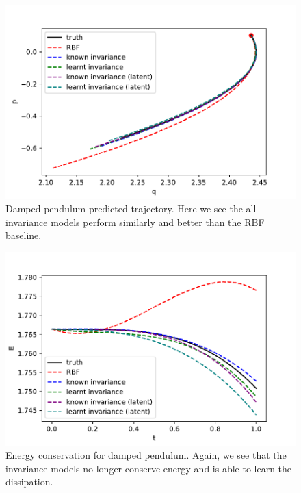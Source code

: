 \documentclass{statsmsc}
\begin{document}
\begin{figure}[H]
        \centering
        \includegraphics[width=0.8\linewidth]{../codes/figures/damped_pendulum_predicted.pdf}
        \caption{Damped pendulum predicted trajectory. Here we see the all invariance models perform similarly and better than the RBF baseline.}
        \label{fig:damped_pendulum_prediction}
\end{figure}

\begin{figure}[H] 
  \includegraphics[width=0.8\linewidth]{../codes/figures/damped_pendulum_energy.pdf}
  \centering
  \caption{Energy conservation for damped pendulum. Again, we see that the invariance models no longer conserve energy and is able to learn the dissipation.}
  \label{fig:damped_pendulum_energy}
\end{figure}
\end{document}
